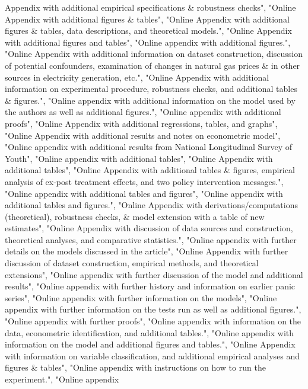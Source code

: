 \documentclass[]{article}
\begin{document}
\begin{itemize}
  Appendix with additional empirical specifications \& robustness
  checks", "Online Appendix with additional figures \& tables", "Online
  Appendix with additional figures \& tables, data descriptions, and
  theoretical models.", "Online Appendix with additional figures and
  tables", "Online appendix with additional figures.", "Online Appendix
  with additional information on dataset construction, discussion of
  potential confounders, examination of changes in natural gas prices \&
  in other sources in electricity generation, etc.", "Online Appendix
  with additional information on experimental procedure, robustness
  checks, and additional tables \& figures.", "Online appendix with
  additional information on the model used by the authors as well as
  additional figures.", "Online appendix with additional proofs",
  "Online Appendix with additional regressions, tables, and graphs",
  "Online Appendix with additional results and notes on econometric
  model", "Online appendix with additional results from National
  Longitudinal Survey of Youth", "Online appendix with additional
  tables", "Online Appendix with additional tables", "Online Appendix
  with additional tables \& figures, empirical analysis of ex-post
  treatment effects, and two policy intervention messages.", "Online
  appendix with additional tables and figures", "Online appendix with
  additional tables and figures.", "Online Appendix with
  derivations/computations (theoretical), robustness checks, \& model
  extension with a table of new estimates", "Online Appendix with
  discussion of data sources and construction, theoretical analyses, and
  comparative statistics.", "Online appendix with further details on the
  models discussed in the article", "Online Appendix with further
  discussion of dataset construction, empirical methods, and theoretical
  extensions", "Online appendix with further discussion of the model and
  additional results", "Online appendix with further history and
  information on earlier panic series", "Online appendix with further
  information on the models", "Online appendix with further information
  on the tests run as well as additional figures.", "Online appendix
  with further proofs", "Online appendix with information on the data,
  econometric identification, and additional tables.", "Online appendix
  with information on the model and additional figures and tables.",
  "Online Appendix with information on variable classification, and
  additional empirical analyses and figures \& tables", "Online appendix
  with instructions on how to run the experiment.", "Online appendix

\end{itemize}
\end{document}
